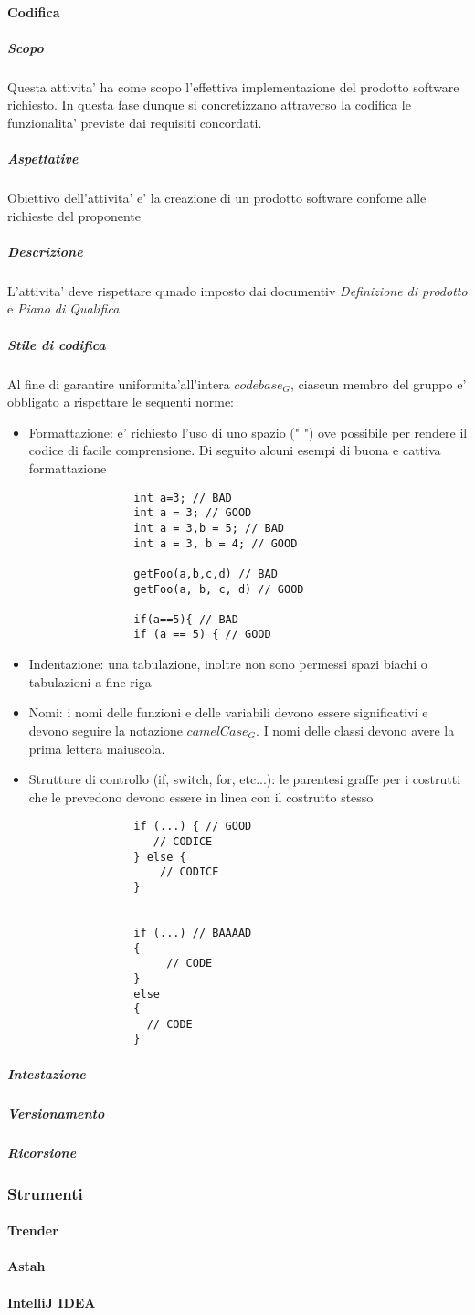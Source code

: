 		\paragraph{Codifica}
			\subparagraph{Scopo}
			Questa attivita' ha come scopo l'effettiva implementazione del prodotto software richiesto. In questa fase dunque si concretizzano attraverso la codifica le funzionalita' previste dai requisiti concordati.
			\subparagraph{Aspettative}
			Obiettivo dell'attivita' e' la creazione di un prodotto software confome alle richieste del proponente
			\subparagraph{Descrizione}
			L'attivita' deve rispettare qunado imposto dai documentiv \textit{Definizione di prodotto} e \textit{Piano di Qualifica}
			\subparagraph{Stile di codifica}
			Al fine di garantire uniformita'all'intera $codebase_G$, ciascun membro del gruppo e' obbligato a rispettare le sequenti norme:
			\begin{itemize}
			\item Formattazione: e' richiesto l'uso di uno spazio (" ") ove possibile per rendere il codice di facile comprensione.
			Di seguito alcuni  esempi di buona e cattiva formattazione
			\begin{lstlisting}
				int a=3; // BAD
				int a = 3; // GOOD
				int a = 3,b = 5; // BAD
				int a = 3, b = 4; // GOOD

				getFoo(a,b,c,d) // BAD
				getFoo(a, b, c, d) // GOOD

				if(a==5){ // BAD
				if (a == 5) { // GOOD
			\end{lstlisting}
			
			\item Indentazione: una tabulazione, inoltre non sono permessi spazi biachi o tabulazioni a fine riga
			
			\item Nomi: i nomi delle funzioni e delle variabili devono essere significativi e devono seguire la notazione $camelCase_G$. I nomi delle classi devono avere la prima lettera maiuscola.
			
			\item Strutture di controllo (if, switch, for, etc...): le parentesi graffe per i costrutti che le prevedono devono essere in linea con il costrutto stesso
			\begin{lstlisting}
				if (...) { // GOOD
 				   // CODICE
				} else {
				    // CODICE
				}
	

				if (...) // BAAAAD
				{
					 // CODE
				}
				else 
				{
				  // CODE
				}
			\end{lstlisting}
			\end{itemize}
			\subparagraph{Intestazione}
			\subparagraph{Versionamento}
			\subparagraph{Ricorsione}
	\subsubsection{Strumenti}
		\paragraph{Trender}
		\paragraph{Astah}
		\paragraph{IntelliJ IDEA}
			
			
